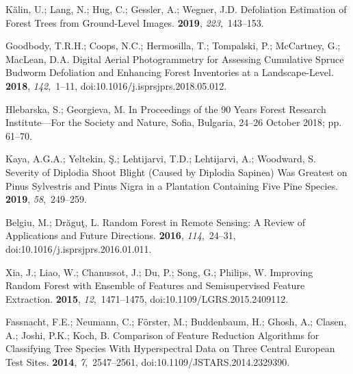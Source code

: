\documentclass[remotesensing,article,accept,moreauthors,pdftex]{Definitions/mdpi}
\begin{document}
\begin{thebibliography}{999}
K{\"a}lin, U.; Lang, N.; Hug, C.; Gessler, A.; Wegner, J.D.
\newblock Defoliation Estimation of Forest Trees from Ground-Level Images.
 {\bf 2019}, {\em 223},~143--153.

Goodbody, T.R.H.; Coops, N.C.; Hermosilla, T.; Tompalski, P.; McCartney, G.;
  MacLean, D.A.
\newblock Digital Aerial Photogrammetry for Assessing Cumulative Spruce Budworm
  Defoliation and Enhancing Forest Inventories at a Landscape-Level.
 {\bf 2018},
  {\em 142},~1--11, doi:10.1016/j.isprsjprs.2018.05.012.

Hlebarska, S.; Georgieva, M.
\newblock In Proceedings of the 90 Years Forest Research Institute---For
  the Society and Nature, Sofia, Bulgaria, 24--26 October 2018;   pp.
  61--70.

Kaya, A.G.A.; Yeltekin, {\c S}.; Lehtijarvi, T.D.; Lehtijarvi, A.; Woodward, S.
\newblock Severity of {{Diplodia}} Shoot Blight (Caused by {{Diplodia}}
  Sapinea) Was Greatest on {{Pinus}} Sylvestris and {{Pinus}} Nigra in a
  Plantation Containing Five Pine Species.
 {\bf 2019}, {\em 58},~249--259.

Belgiu, M.; Dr{\u a}gu{\c t}, L.
\newblock Random Forest in Remote Sensing: A Review of Applications and Future
  Directions.
 {\bf 2016},
  {\em 114},~24--31, doi:10.1016/j.isprsjprs.2016.01.011.

Xia, J.; Liao, W.; Chanussot, J.; Du, P.; Song, G.; Philips, W.
\newblock Improving {{Random Forest with Ensemble}} of {{Features}} and
  {{Semisupervised Feature Extraction}}.
 {\bf 2015}, {\em
  12},~1471--1475, doi:10.1109/LGRS.2015.2409112.

Fassnacht, F.E.; Neumann, C.; F{\"o}rster, M.; Buddenbaum, H.; Ghosh, A.;
  Clasen, A.; Joshi, P.K.; Koch, B.
\newblock Comparison of {{Feature Reduction Algorithms}} for {{Classifying Tree
  Species With Hyperspectral Data}} on {{Three Central European Test Sites}}.
 {\bf 2014}, {\em 7},~2547--2561, doi:10.1109/JSTARS.2014.2329390.


\end{thebibliography}
\end{document}
